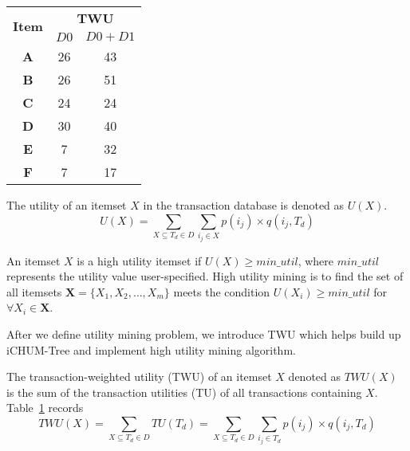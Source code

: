 \documentclass[runningheads,a4paper]{llncs}
\begin{document}
\begin{table}
\begin{minipage}[t]{.25\linewidth}
\begin{tabular}{|c|c|c|}
\multicolumn{1}{|c}{\multirow{2}[0]{*}{\textbf{Item}}} & \multicolumn{2}{|c|}{\textbf{TWU}} \\
\cline{2-3}\multicolumn{1}{|c|}{} & $ D0 $    & $ D0+D1 $ \\
\cline{1-3}
\textbf{A} & 26& 43\\ \hline
\textbf{B} & 26& 51 \\ \hline
\textbf{C} & 24& 24\\ \hline
\textbf{D} & 30& 40 \\ \hline
\textbf{E} & 7& 32\\ \hline
\textbf{F} & 7& 17\\ \hline
\end{tabular}
\label{table:3}
\end{minipage}

\end{table}

\begin{definition} %
The utility of an itemset $ X $ in the transaction database is denoted as $ U(X) $. 
\begin{equation}
U(X) = \sum_{X \subseteq T_{d} \in D} \sum_{i_{j} \in X} p(i_{j}) \times q(i_{j},T_{d})
\end{equation}
\end{definition}
\begin{definition} %
An itemset $ X $ is a high utility itemset if $ U(X) \geqslant min\_util $, where $ min\_util $ represents the utility value user-specified. High utility mining is to find the set of all itemsets $ \mathbf{X} = \{X_{1},X_{2},\ldots,X_{m}\} $ meets the condition $ U(X_{i}) \geqslant min\_util $ for $ \forall X_{i} \in \mathbf{X} $. 
\end{definition}

After we define utility mining problem, we introduce TWU \cite{Liu:two-phase} which helps build up iCHUM-Tree and implement high utility mining algorithm.

\begin{definition} 
The transaction-weighted utility (TWU) of an itemset $ X $ denoted as $ TWU(X) $ is the sum of the transaction utilities (TU) of all transactions containing $ X $. Table~\ref{table:3} records
\begin{equation}
TWU(X) = \sum_{X \subseteq T_{d} \in D}TU(T_{d}) = \sum_{X \subseteq T_{d} \in D} \sum_{i_{j} \in T_{d}} p(i_{j}) \times q(i_{j},T_{d})
\end{equation}
\end{definition}
\end{document}
